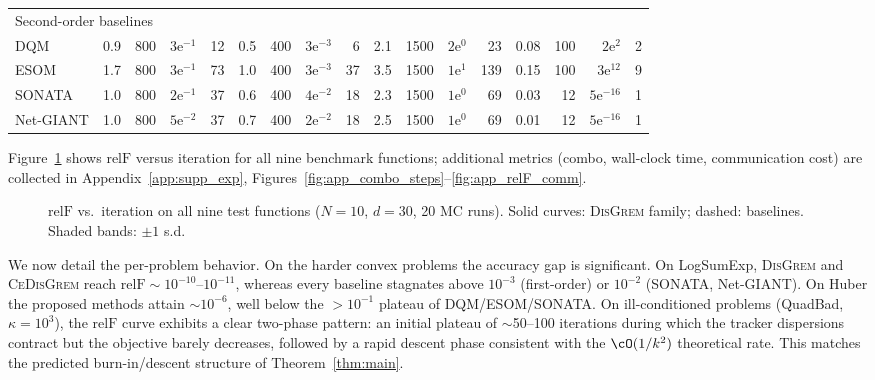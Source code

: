 \documentclass[review,onefignum,onetabnum]{siamart171218}
\begin{document}
\begin{table}[htbp]
{\begin{tabular}{l rrrr rrrr rrrr rrrr}
				\midrule
				\multicolumn{17}{l}{Second-order baselines} \\
				DQM    & 0.9 & 800 & $3\mathrm{e}^{-1}$  & 12
				& 0.5 & 400 & $3\mathrm{e}^{-3}$  & 6
				& 2.1 & 1500 & $2\mathrm{e}^{0}$   & 23
				& 0.08 & 100 & $2\mathrm{e}^{2}$   & 2 \\
				ESOM   & 1.7 & 800 & $3\mathrm{e}^{-1}$  & 73
				& 1.0 & 400 & $3\mathrm{e}^{-3}$  & 37
				& 3.5 & 1500 & $1\mathrm{e}^{1}$   & 139
				& 0.15 & 100 & $3\mathrm{e}^{12}$  & 9 \\
				SONATA & 1.0 & 800 & $2\mathrm{e}^{-1}$  & 37
				& 0.6 & 400 & $4\mathrm{e}^{-2}$  & 18
				& 2.3 & 1500 & $1\mathrm{e}^{0}$   & 69
				& 0.03 & 12  & $5\mathrm{e}^{-16}$ & 1 \\
				Net-GIANT & 1.0 & 800 & $5\mathrm{e}^{-2}$ & 37
				& 0.7 & 400 & $2\mathrm{e}^{-2}$  & 18
				& 2.5 & 1500 & $1\mathrm{e}^{0}$   & 69
				& 0.01 & 12  & $5\mathrm{e}^{-16}$ & 1 \\
				\bottomrule
		\end{tabular}}
	\end{table}
	
	Figure~\ref{fig:relF_steps_all} shows $\mathrm{relF}$ versus iteration for
	all nine benchmark functions; additional metrics (combo, wall-clock
	time, communication cost) are collected in
	Appendix~\ref{app:supp_exp},
	Figures~\ref{fig:app_combo_steps}--\ref{fig:app_relF_comm}.
	
	\begin{figure}[htbp]
		\centering
		\caption{$\mathrm{relF}$ vs.\ iteration on all nine test functions
			($N{=}10$, $d{=}30$, 20 MC runs).
			Solid curves: \textsc{DisGrem} family; dashed: baselines.
			Shaded bands: $\pm 1$ s.d.}
		\label{fig:relF_steps_all}
	\end{figure}
	
	We now detail the per-problem behavior.
	On the harder convex problems the accuracy gap is significant.
	On LogSumExp, \textsc{DisGrem} and \textsc{CeDisGrem} reach
	$\mathrm{relF}\sim10^{-10}$--$10^{-11}$, whereas every baseline
	stagnates above $10^{-3}$ (first-order) or $10^{-2}$
	(SONATA, Net-GIANT).
	On Huber the proposed methods attain $\sim10^{-6}$, well
	below the $>10^{-1}$ plateau of DQM/ESOM/SONATA.
	On ill-conditioned problems (QuadBad, $\kappa{=}10^3$), the $\mathrm{relF}$
	curve exhibits a clear two-phase pattern: an initial plateau of
	$\sim$50--100 iterations during which the tracker dispersions
	contract but the objective barely decreases, followed by a rapid
	descent phase consistent with the $\cO(1/k^2)$ theoretical rate.
	This matches the predicted burn-in/descent structure of
	Theorem~\ref{thm:main}.
	
\end{document}

